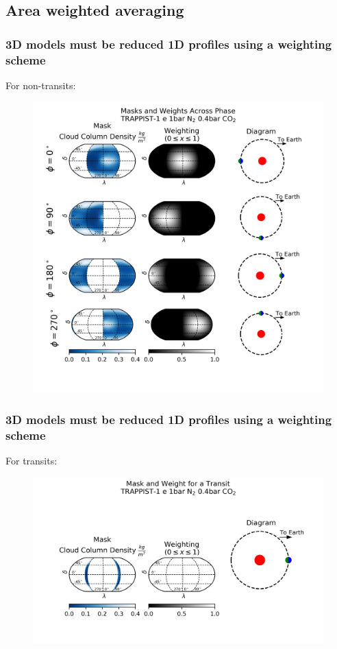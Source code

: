 \documentclass{beamer}
\begin{document}
\subsection{Area weighted averaging}
\begin{frame}
    \frametitle{3D models must be reduced 1D profiles using a weighting scheme}
    For non-transits:
    \begin{figure}
        \includegraphics[height=0.8\textheight]{methods/phases_weights.png}
    \end{figure}
\end{frame}

\begin{frame}
    \frametitle{3D models must be reduced 1D profiles using a weighting scheme}
    For transits:
    \begin{figure}
        \includegraphics[width=\textwidth]{methods/transit_weights.png}
    \end{figure}
\end{frame}
\end{document}
